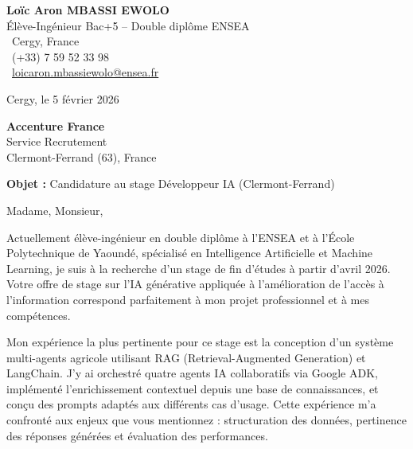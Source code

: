 \documentclass[a4paper,11pt]{article}
\begin{document}
\noindent
\begin{minipage}[t]{0.5\textwidth}
    \textbf{Loïc Aron MBASSI EWOLO}\\
    Élève-Ingénieur Bac+5 -- Double diplôme ENSEA\\[3pt]
    \faMapMarker\ Cergy, France\\
    \faPhone\ (+33) 7 59 52 33 98\\
    \faEnvelope\ \href{mailto:loicaron.mbassiewolo@ensea.fr}{loicaron.mbassiewolo@ensea.fr}
\end{minipage}
\hfill
\begin{minipage}[t]{0.4\textwidth}
    \raggedleft
    Cergy, le 5 février 2026
\end{minipage}

\vspace{1.2cm}

\hfill
\begin{minipage}[t]{0.5\textwidth}
    \raggedleft
    \textbf{Accenture France}\\
    Service Recrutement\\
    Clermont-Ferrand (63), France
\end{minipage}

\vspace{1cm}

\noindent\textbf{Objet :} Candidature au stage Développeur IA (Clermont-Ferrand)

\vspace{0.8cm}

Madame, Monsieur,

Actuellement élève-ingénieur en double diplôme à l'ENSEA et à l'École Polytechnique de Yaoundé, spécialisé en Intelligence Artificielle et Machine Learning, je suis à la recherche d'un stage de fin d'études à partir d'avril 2026. Votre offre de stage sur l'IA générative appliquée à l'amélioration de l'accès à l'information correspond parfaitement à mon projet professionnel et à mes compétences.

Mon expérience la plus pertinente pour ce stage est la conception d'un système multi-agents agricole utilisant RAG (Retrieval-Augmented Generation) et LangChain. J'y ai orchestré quatre agents IA collaboratifs via Google ADK, implémenté l'enrichissement contextuel depuis une base de connaissances, et conçu des prompts adaptés aux différents cas d'usage. Cette expérience m'a confronté aux enjeux que vous mentionnez : structuration des données, pertinence des réponses générées et évaluation des performances.
\end{document}
